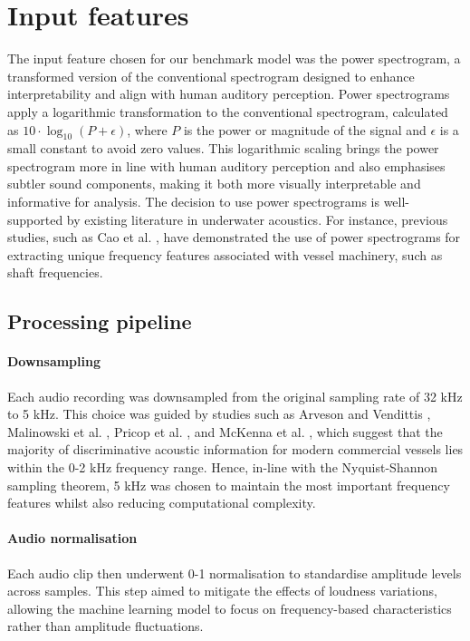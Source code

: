 \section{Input features}\label{sec:inputs}

The input feature chosen for our benchmark model was the power spectrogram, a transformed version of the conventional spectrogram designed to enhance interpretability and align with human auditory perception. Power spectrograms apply a logarithmic transformation to the conventional spectrogram, calculated as $10 \cdot \log_{10}(P + \epsilon)$, where $P$ is the power or magnitude of the signal and $\epsilon$ is a small constant to avoid zero values. This logarithmic scaling brings the power spectrogram more in line with human auditory perception and also emphasises subtler sound components, making it both more visually interpretable and informative for analysis. The decision to use power spectrograms is well-supported by existing literature in underwater acoustics. For instance, previous studies, such as Cao et al. \cite{cao_underwater_2019}, have demonstrated the use of power spectrograms for extracting unique frequency features associated with vessel machinery, such as shaft frequencies. 

\subsection{Processing pipeline}

\paragraph{Downsampling}
Each audio recording was downsampled from the original sampling rate of 32 kHz to 5 kHz. This choice was guided by studies such as Arveson and Vendittis \cite{arveson_radiated_2000}, Malinowski et al. \cite{malinowski_underwater_2001}, Pricop et al. \cite{pricop_underwater_2010}, and McKenna et al. \cite{mckenna_underwater_2012}, which suggest that the majority of discriminative acoustic information for modern commercial vessels lies within the 0-2 kHz frequency range. Hence, in-line with the Nyquist-Shannon sampling theorem, 5 kHz was chosen to maintain the most important frequency features whilst also reducing computational complexity. 

\paragraph{Audio normalisation}
Each audio clip then underwent 0-1 normalisation to standardise amplitude levels across samples. This step aimed to mitigate the effects of loudness variations, allowing the machine learning model to focus on frequency-based characteristics rather than amplitude fluctuations.

